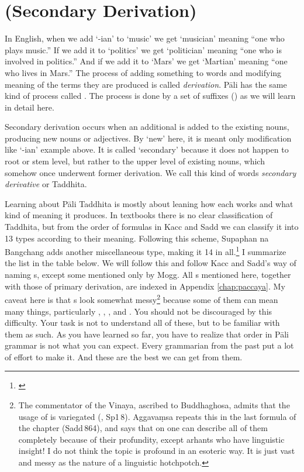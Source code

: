 \chapter{ (Secondary Derivation)}\label{chap:taddhita}

In English, when we add `-ian' to `music' we get `musician' meaning ``one who plays music.'' If we add it to `politics' we get `politician' meaning ``one who is involved in politics.'' And if we add it to `Mars' we get `Martian' meaning ``one who lives in Mars.'' The process of adding something to words and modifying meaning of the terms they are produced is called \emph{derivation}. P\=ali has the same kind of process called . The process is done by a set of suffixes () as we will learn in detail here.

Secondary derivation occurs when an additional  is added to the existing nouns, producing new nouns or adjectives. By `new' here, it is meant only modification like `-ian' example above. It is called `secondary' because it does not happen to root or stem level, but rather to the upper level of existing nouns, which somehow once underwent former derivation. We call this kind of words \emph{secondary derivative} or Taddhita.

Learning about P\=ali Taddhita is mostly about leaning how each  works and what kind of meaning it produces. In textbooks there is no clear classification of Taddhita, but from the order of formulas in Kacc and Sadd we can classify it into 13 types according to their meaning. Following this scheme, Supaphan na Bangchang adds another miscellaneous type, making it 14 in all.\footnote{\citealp[p.~399]{supaphan:pali}} I summarize the list in the table below. We will follow this and follow Kacc and Sadd's way of naming s, except some mentioned only by Mogg. All s mentioned here, together with those of primary derivation, are indexed in Appendix \ref{chap:paccaya}. My caveat here is that s look somewhat messy\footnote{The commentator of the Vinaya, ascribed to Buddhaghosa, admits that the usage of  is variegated (, Sp1\,8). Aggava\d msa repeats this in the last formula of the chapter (Sadd\,864), and says that on one can describe all of them completely because of their profundity, except arhants who have linguistic insight! I do not think the topic is profound in an esoteric way. It is just vast and messy as the nature of a linguistic hotchpotch.} because some of them can mean many things, particularly , , , and . You should not be discouraged by this difficulty. Your task is not to understand all of these, but to be familiar with them as such. As you have learned so far, you have to realize that order in P\=ali grammar is not what you can expect. Every grammarian from the past put a lot of effort to make it. And these are the best we can get from them.

